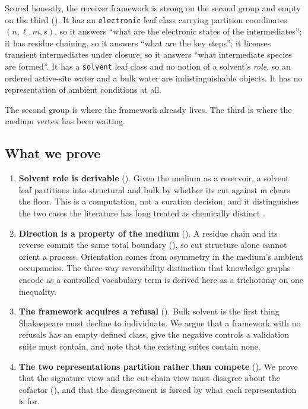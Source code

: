 \documentclass[11pt,twocolumn,a4paper]{article}
\theoremstyle{thmstyle}
\theoremstyle{definition}
\theoremstyle{remark}
\newcommand{\med}{\mathsf{m}}
\newcommand{\shk}[1]{\texttt{#1}}
\newcommand{\Str}{\textsf{structural}}
\newcommand{\Blk}{\textsf{bulk}}
\begin{document}
Scored honestly, the receiver framework is strong on the second group and
empty on the third (). It has an \shk{electronic}
leaf class carrying partition coordinates $(n,\ell,m,s)$, so it answers
``what are the electronic states of the intermediates''; it has residue
chaining, so it answers ``what are the key steps''; it licenses transient
intermediates under closure, so it answers ``what intermediate species
are formed''. It has a \shk{solvent} leaf class and no notion of a
solvent's \emph{role}, so an ordered active-site water and a bulk water
are indistinguishable objects. It has no representation of ambient
conditions at all.

The second group is where the framework already lives. The third is where
the medium vertex has been waiting.

\subsection{What we prove}

\begin{enumerate}[leftmargin=1.6em,itemsep=3pt]
\item \textbf{Solvent role is derivable} (). Given
the medium as a reservoir, a solvent leaf partitions into
\Str{} and \Blk{} by whether its cut against $\med$ clears the floor.
This is a computation, not a curation decision, and it distinguishes the
two cases the literature has long treated as chemically distinct
\citep{ball2008water,levy2006water,poornima1995hydration}.

\item \textbf{Direction is a property of the medium}
(). A residue chain and its reverse commit the same
total boundary (), so cut structure alone cannot
orient a process. Orientation comes from asymmetry in the medium's
ambient occupancies. The three-way reversibility distinction that
knowledge graphs encode as a controlled vocabulary term is derived here
as a trichotomy on one inequality.

\item \textbf{The framework acquires a refusal} ().
Bulk solvent is the first thing Shakespeare must decline to individuate.
We argue that a framework with no refusals has an empty defined class,
give the negative controls a validation suite must contain, and note that
the existing suites contain none.

\item \textbf{The two representations partition rather than compete}
(). We prove that the signature view and the cut-chain
view must disagree about the cofactor (), and that the
disagreement is forced by what each representation is for.
\end{enumerate}
\end{document}
